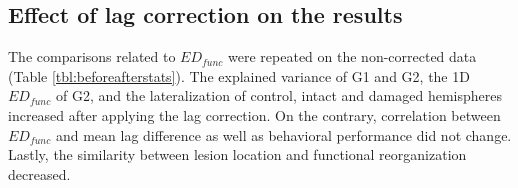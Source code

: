 \documentclass[fleqn,10pt]{wlscirep}
\begin{document}
\subsection*{Effect of lag correction on the results}
The comparisons related to $\textit{ED}_{{func}}$ were repeated on the non-corrected data (Table \ref{tbl:beforeafterstats}). The explained variance of G1 and G2, the 1D $\textit{ED}_{{func}}$ of G2, and the lateralization of control, intact and damaged hemispheres increased after applying the lag correction. On the contrary, correlation between $\textit{ED}_{{func}}$ and mean lag difference as well as behavioral performance did not change. Lastly, the similarity between lesion location and functional reorganization decreased. 

\begin{table}[]
\resizebox{\textwidth}{!}{%

}
\end{table}
\end{document}

